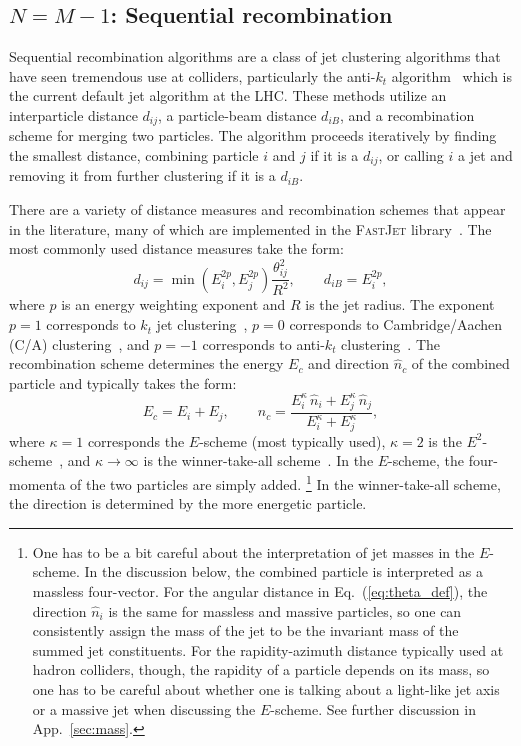 \documentclass[letterpaper,11pt]{article}
\DeclareRobustCommand{\App}[1]{App.~\ref{#1}}
\DeclareRobustCommand{\Eq}[1]{Eq.~(\ref{#1})}
\begin{document}
\subsection{$N=M-1$: Sequential recombination}
\label{sec:seqrec}


Sequential recombination algorithms are a class of jet clustering algorithms that have seen tremendous use at colliders, particularly the anti-$k_t$ algorithm~\cite{Cacciari:2008gp} which is the current default jet algorithm at the LHC.
%
These methods utilize an interparticle distance $d_{ij}$, a particle-beam distance $d_{iB}$, and a recombination scheme for merging two particles.
%
The algorithm proceeds iteratively by finding the smallest distance, combining particle $i$ and $j$ if it is a $d_{ij}$, or calling $i$ a jet and removing it from further clustering if it is a $d_{iB}$.


There are a variety of distance measures and recombination schemes that appear in the literature, many of which are implemented in the \textsc{FastJet} library~\cite{Cacciari:2011ma}.
%
The most commonly used distance measures take the form:
%
\begin{equation}\label{eq:dij}
d_{ij} = \min\left(E_i^{2p}, E_j^{2p}\right) \frac{\theta_{ij}^2}{R^2},\quad \quad d_{iB} = E_i^{2p},
\end{equation}
%
where $p$ is an energy weighting exponent and $R$ is the jet radius.
%
The exponent $p=1$ corresponds to $k_t$ jet clustering~\cite{Catani:1993hr,Ellis:1993tq}, $p=0$ corresponds to Cambridge/Aachen (C/A) clustering~\cite{Dokshitzer:1997in,Wobisch:1998wt}, and $p=-1$ corresponds to anti-$k_t$ clustering~\cite{Cacciari:2008gp}.
%
The recombination scheme determines the energy $E_c$ and direction $\hat n_c$ of the combined particle and typically takes the form:
%
\begin{equation}
\label{eq:recomb}
E_c = E_i  + E_j,\quad \quad \hat n_c = \frac{E_i^\kappa \, \hat n_i + E_j^\kappa \, \hat n_j}{E_i^\kappa + E_j^\kappa},
\end{equation}
%
where $\kappa=1$ corresponds the $E$-scheme (most typically used), $\kappa=2$ is the $E^2$-scheme~\cite{Catani:1993hr,Butterworth:2002xg}, and $\kappa\to\infty$ is the winner-take-all scheme~\cite{Bertolini:2013iqa,Larkoski:2014uqa,Salambroadening}.
%
In the $E$-scheme, the four-momenta of the two particles are simply added.%
%
\footnote{\label{footnote:Escheme}One has to be a bit careful about the interpretation of jet masses in the $E$-scheme.  In the discussion below, the combined particle is interpreted as a massless four-vector.  For the angular distance in \Eq{eq:theta_def}, the direction $\hat{n}_i$ is the same for massless and massive particles, so one can consistently assign the mass of the jet to be the invariant mass of the summed jet constituents.  For the rapidity-azimuth distance typically used at hadron colliders, though, the rapidity of a particle depends on its mass, so one has to be careful about whether one is talking about a light-like jet axis or a massive jet when discussing the $E$-scheme.  See further discussion in \App{sec:mass}.}
%
In the winner-take-all scheme, the direction is determined by the more energetic particle.
\end{document}
